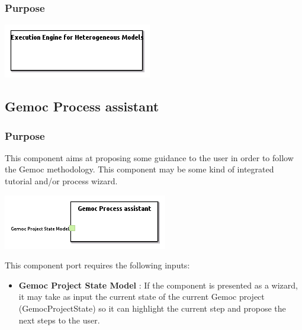 \documentclass{gemoc} %
\begin{document}

\subsubsection{Purpose}


\begin{center}
\includegraphics*[trim=0.0cm 0.0cm 0cm 0.0cm, clip=true]{../images/generated/Generated_Execution_Engine_for_Heterogeneous_Models.png}
\end{center}




\subsection{Gemoc Process assistant}


\subsubsection{Purpose}
This component aims at proposing some guidance to the user in order to follow the Gemoc methodology. This component may be some kind of integrated tutorial and/or process wizard.

\begin{center}
\includegraphics*[trim=0.0cm 0.0cm 0cm 0.0cm, clip=true]{../images/generated/Generated_Gemoc_Process_assistant.png}
\end{center}

This component port requires the following inputs:
\begin{itemize}
  \item \textbf{Gemoc Project State Model} :
If the component is presented as a wizard, it may take as input the current state of the current Gemoc project (GemocProjectState) so it can highlight the current step and propose the next steps to the user.
\end{itemize}
\end{document}
